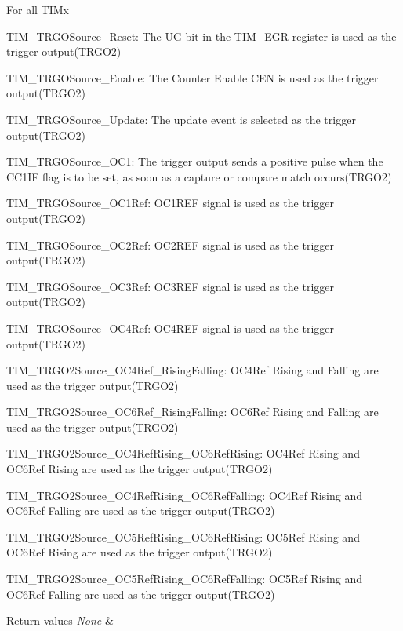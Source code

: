 \begin{DoxyItemize}
\item For all T\-I\-Mx \begin{DoxyItemize}
\item T\-I\-M\-\_\-\-T\-R\-G\-O\-Source\-\_\-\-Reset\-: The U\-G bit in the T\-I\-M\-\_\-\-E\-G\-R register is used as the trigger output(\-T\-R\-G\-O2) \item T\-I\-M\-\_\-\-T\-R\-G\-O\-Source\-\_\-\-Enable\-: The Counter Enable C\-E\-N is used as the trigger output(\-T\-R\-G\-O2) \item T\-I\-M\-\_\-\-T\-R\-G\-O\-Source\-\_\-\-Update\-: The update event is selected as the trigger output(\-T\-R\-G\-O2) \item T\-I\-M\-\_\-\-T\-R\-G\-O\-Source\-\_\-\-O\-C1\-: The trigger output sends a positive pulse when the C\-C1\-I\-F flag is to be set, as soon as a capture or compare match occurs(\-T\-R\-G\-O2) \item T\-I\-M\-\_\-\-T\-R\-G\-O\-Source\-\_\-\-O\-C1\-Ref\-: O\-C1\-R\-E\-F signal is used as the trigger output(\-T\-R\-G\-O2) \item T\-I\-M\-\_\-\-T\-R\-G\-O\-Source\-\_\-\-O\-C2\-Ref\-: O\-C2\-R\-E\-F signal is used as the trigger output(\-T\-R\-G\-O2) \item T\-I\-M\-\_\-\-T\-R\-G\-O\-Source\-\_\-\-O\-C3\-Ref\-: O\-C3\-R\-E\-F signal is used as the trigger output(\-T\-R\-G\-O2) \item T\-I\-M\-\_\-\-T\-R\-G\-O\-Source\-\_\-\-O\-C4\-Ref\-: O\-C4\-R\-E\-F signal is used as the trigger output(\-T\-R\-G\-O2) \item T\-I\-M\-\_\-\-T\-R\-G\-O2\-Source\-\_\-\-O\-C4\-Ref\-\_\-\-Rising\-Falling\-: O\-C4\-Ref Rising and Falling are used as the trigger output(\-T\-R\-G\-O2) \item T\-I\-M\-\_\-\-T\-R\-G\-O2\-Source\-\_\-\-O\-C6\-Ref\-\_\-\-Rising\-Falling\-: O\-C6\-Ref Rising and Falling are used as the trigger output(\-T\-R\-G\-O2) \item T\-I\-M\-\_\-\-T\-R\-G\-O2\-Source\-\_\-\-O\-C4\-Ref\-Rising\-\_\-\-O\-C6\-Ref\-Rising\-: O\-C4\-Ref Rising and O\-C6\-Ref Rising are used as the trigger output(\-T\-R\-G\-O2) \item T\-I\-M\-\_\-\-T\-R\-G\-O2\-Source\-\_\-\-O\-C4\-Ref\-Rising\-\_\-\-O\-C6\-Ref\-Falling\-: O\-C4\-Ref Rising and O\-C6\-Ref Falling are used as the trigger output(\-T\-R\-G\-O2) \item T\-I\-M\-\_\-\-T\-R\-G\-O2\-Source\-\_\-\-O\-C5\-Ref\-Rising\-\_\-\-O\-C6\-Ref\-Rising\-: O\-C5\-Ref Rising and O\-C6\-Ref Rising are used as the trigger output(\-T\-R\-G\-O2) \item T\-I\-M\-\_\-\-T\-R\-G\-O2\-Source\-\_\-\-O\-C5\-Ref\-Rising\-\_\-\-O\-C6\-Ref\-Falling\-: O\-C5\-Ref Rising and O\-C6\-Ref Falling are used as the trigger output(\-T\-R\-G\-O2)\end{DoxyItemize}

\begin{DoxyRetVals}{Return values}
{\em None} & \\
\hline
\end{DoxyRetVals}

\end{DoxyItemize}

